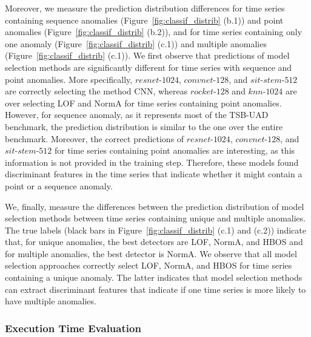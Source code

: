 Moreover, we measure the prediction distribution differences for time series containing sequence anomalies (Figure~\ref{fig:classif_distrib} (b.1)) and point anomalies (Figure~\ref{fig:classif_distrib} (b.2)), and for time series containing only one anomaly (Figure~\ref{fig:classif_distrib} (c.1)) and multiple anomalies (Figure~\ref{fig:classif_distrib} (c.1)). We first observe that predictions of model selection methods are significantly different for time series with sequence and point anomalies. More specifically, $resnet$-$1024$, $convnet$-$128$, and $sit$-$stem$-$512$ are correctly selecting the method CNN, whereas $rocket$-$128$ and $knn$-$1024$ are over selecting LOF and NormA for time series containing point anomalies. However, for sequence anomaly, as it represents most of the TSB-UAD benchmark, the prediction distribution is similar to the one over the entire benchmark. Moreover, the correct predictions of $resnet$-$1024$, $convnet$-$128$, and $sit$-$stem$-$512$ for time series containing point anomalies are interesting, as this information is not provided in the training step. Therefore, these models found discriminant features in the time series that indicate whether it might contain a point or a sequence anomaly.

We, finally, measure the differences between the prediction distribution of model selection methods between time series containing unique and multiple anomalies. The true labels (black bars in Figure~\ref{fig:classif_distrib} (c.1) and (c.2)) indicate that, for unique anomalies, the best detectors are LOF, NormA, and HBOS and for multiple anomalies, the best detector is NormA. We observe that all model selection approaches correctly select LOF, NormA, and HBOS for time series containing a unique anomaly. The latter indicates that model selection methods can extract discriminant features that indicate if one time series is more likely to have multiple anomalies.


\subsubsection{\textbf{Execution Time Evaluation}}


